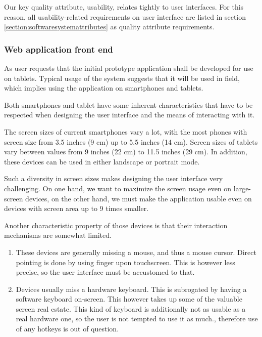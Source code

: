 \documentclass[11pt]{book}
\begin{document}
Our key quality attribute, usability, relates tightly to user interfaces. For this reason, all usability-related requirements on user interface are listed in section \ref{section:softwaresystemattributes} as quality attribute requirements.

\subsubsection{Web application front end}\label{section:srs-webapplicationfrontend}
As user requests that the initial prototype application shall be developed for use on tablets. Typical usage of the system suggests that it will be used in field, which implies using the application on smartphones and tablets.

Both smartphones and tablet have some inherent characteristics that have to be respected when designing the user interface and the means of interacting with it.

The screen sizes of current smartphones vary a lot, with the most phones with screen size from 3.5 inches (9 cm) up to 5.5 inches (14 cm). Screen sizes of tablets vary between values from 9 inches (22 cm) to 11.5 inches (29 cm). In addition, these devices can be used in either landscape or portrait mode.

Such a diversity in screen sizes makes designing the user interface very challenging. On one hand, we want to maximize the screen usage even on large-screen devices, on the other hand, we must make the application usable even on devices with screen area up to 9 times smaller.

Another characteristic property of those devices is that their interaction mechanisms are somewhat limited.

\begin{enumerate}
  \item These devices are generally missing a mouse, and thus a mouse cursor. Direct pointing is done by using finger upon touchscreen. This is however less precise, so the user interface must be accustomed to that.
  \item Devices usually miss a hardware keyboard. This is subrogated by having a software keyboard on-screen. This however takes up some of the valuable screen real estate. This kind of keyboard is additionally not as usable as a real hardware one, so the user is not tempted to use it as much., therefore use of any hotkeys is out of question.
\end{enumerate}
\end{document}
